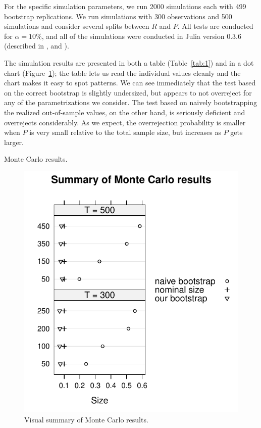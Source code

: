 \documentclass[12pt,fleqn]{article}
\begin{document}
For the specific simulation parameters, we run 2000 simulations each
with 499 bootstrap replications. We run simulations with 300
observations and 500 simulations and consider several splits between
$R$ and $P$. All tests are conducted for $\alpha = 10\%$, and all of
the simulations were conducted in Julia version 0.3.6 (described in
\citealp{BKSE12}, and \citealp{BEKS14}).

The simulation results are presented in both a table
(Table~\ref{tab:1}) and in a dot chart (Figure~\ref{fig:1}); the table
lets us read the individual values cleanly and the chart makes it easy
to spot patterns. We can see immediately that the test based on the
correct bootstrap is slightly undersized, but appears to not
overreject for any of the parametrizations we consider. The test
based on naively bootstrapping the realized out-of-sample values, on
the other hand, is seriously deficient and overrejects
considerably. As we expect, the overrejection probability is smaller
when $P$ is very small relative to the total sample size, but increases
as $P$ gets larger.

\begin{table}[t]
  \centering
  
  \caption{Monte Carlo results.}
  \label{tab:1}
\end{table}

\begin{figure}[b]
  \centering
  \includegraphics{montecarlo/west_iv.pdf}
  \caption{Visual summary of Monte Carlo results.}
  \label{fig:1}
\end{figure}
\end{document}
